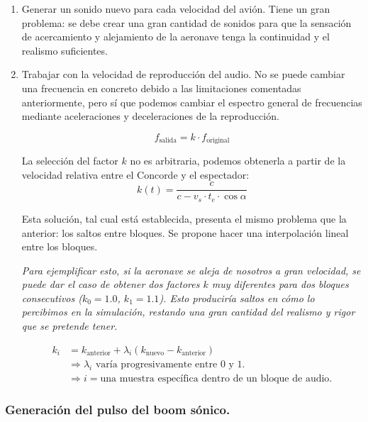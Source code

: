 \documentclass[10.5pt]{article}
\begin{document}
	\begin{enumerate}
		\item Generar un sonido nuevo para cada velocidad del avión. Tiene un gran problema: se debe crear una gran cantidad de sonidos para que la sensación de acercamiento y alejamiento de la aeronave tenga la continuidad y el realismo suficientes.
		
		\item Trabajar con la velocidad de reproducción del audio. No se puede cambiar una frecuencia en concreto debido a las limitaciones comentadas anteriormente, pero sí que podemos cambiar el espectro general de frecuencias mediante aceleraciones y deceleraciones de la reproducción.
		
		\begin{equation*}
			f_{\text{salida}} = k \cdot f_{\text{original}}
		\end{equation*}
		
		La selección del factor $k$ no es arbitraria, podemos obtenerla a partir de la velocidad relativa entre el Concorde y el espectador:
		\begin{equation*}
			k(t) = \frac{c}{c - v_s \cdot t_e \cdot \cos \alpha}
		\end{equation*}
		
		Esta solución, tal cual está establecida, presenta el mismo problema que la anterior: los saltos entre bloques. Se propone hacer una interpolación lineal entre los bloques. 
		
		\textit{Para ejemplificar esto, si la aeronave se aleja de nosotros a gran velocidad, se puede dar el caso de obtener dos factores $k$ muy diferentes para dos bloques consecutivos ($k_0 = 1.0$, $k_1 = 1.1$). Esto produciría saltos en cómo lo percibimos en la simulación, restando una gran cantidad del realismo y rigor que se pretende tener.}
		
		\begin{align*}
			k_i &= k_{\text{anterior}} + \lambda_i \left(k_{\text{nuevo}} - k_{\text{anterior}}\right) \\
			&\Rightarrow \text{$\lambda_i$ varía progresivamente entre 0 y 1.} \\
			&\Rightarrow i = \text{una muestra específica dentro de un bloque de audio.}
		\end{align*}
	\end{enumerate}
	
	\subsubsection{Generación del pulso del boom sónico.}
	
\end{document}
